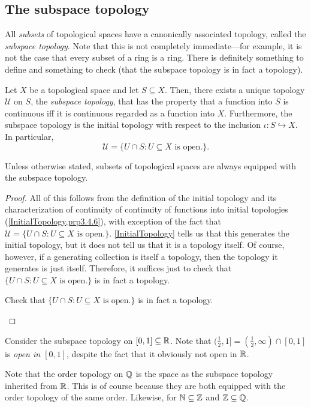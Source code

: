 \subsection{The subspace topology}

All \emph{subsets} of topological spaces have a canonically associated topology, called the \emph{subspace topology}.  Note that this is not completely immediate---for example, it is not the case that every subset of a ring is a ring.  There is definitely something to define and something to check (that the subspace topology is in fact a topology).
\begin{prp}\label{SubspaceTopology}
Let $X$ be a topological space and let $S\subseteq X$.  Then, there exists a unique topology $\mathcal{U}$ on $S$, the \emph{subspace topology}, that has the property that a function into $S$ is continuous iff it is continuous regarded as a function into $X$.  Furthermore, the subspace topology is the initial topology with respect to the inclusion $\iota :S\hookrightarrow X$.  In particular,
\begin{equation}
\mathcal{U}=\{ U\cap S:U\subseteq X\text{ is open.}\} .
\end{equation}
\begin{rmk}
Unless otherwise stated, subsets of topological spaces are always equipped with the subspace topology.
\end{rmk}
\begin{proof}
All of this follows from the definition of the initial topology and its characterization of continuity of continuity of functions into initial topologies (\cref{InitialTopology,prp3.4.6}), with exception of the fact that $\mathcal{U}=\{ U\cap S:U\subseteq X\text{ is open.}\}$.  \cref{InitialTopology} tells us that this generates the initial topology, but it does not tell us that it is a topology itself.  Of course, however, if a generating collection is itself a topology, then the topology it generates is just itself.  Therefore, it suffices just to check that $\{ U\cap S:U\subseteq X\text{ is open.}\}$ is in fact a topology.
\begin{exr}
Check that $\{ U\cap S:U\subseteq X\text{ is open.}\}$ is in fact a topology.
\end{exr}
\end{proof}
\end{prp}
\begin{exm}\label{exm4.1.14}
Consider the subspace topology on $[0,1]\subseteq \mathbb{R}$.  Note that $(\frac{1}{2},1]=(\frac{1}{2},\infty )\cap [0,1]$ is \emph{open in $[0,1]$}, despite the fact that it obviously not open in $\mathbb{R}$.
\end{exm}
\begin{exm}
Note that the order topology on $\mathbb{Q}$ is the space as the subspace topology inherited from $\mathbb{R}$.  This is of course because they are both equipped with the order topology of the same order.  Likewise, for $\mathbb{N} \subseteq \mathbb{Z}$ and $\mathbb{Z} \subseteq \mathbb{Q}$.
\end{exm}

